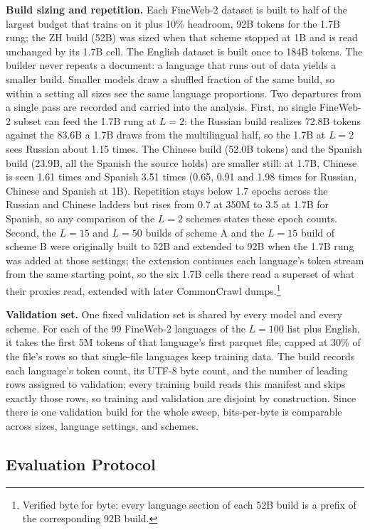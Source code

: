 \textbf{Build sizing and repetition.} Each FineWeb-2 dataset is built to half of the largest budget that trains on it plus 10\% headroom, 92B tokens for the 1.7B rung; the ZH build (52B) was sized when that scheme stopped at 1B and is read unchanged by its 1.7B cell. The English dataset is built once to 184B tokens. The builder never repeats a document: a language that runs out of data yields a smaller build. Smaller models draw a shuffled fraction of the same build, so within a setting all sizes see the same language proportions. Two departures from a single pass are recorded and carried into the analysis. First, no single FineWeb-2 subset can feed the 1.7B rung at $L=2$: the Russian build realizes 72.8B tokens against the 83.6B a 1.7B draws from the multilingual half, so the 1.7B at $L=2$ sees Russian about 1.15 times. The Chinese build (52.0B tokens) and the Spanish build (23.9B, all the Spanish the source holds) are smaller still: at 1.7B, Chinese is seen 1.61 times and Spanish 3.51 times (0.65, 0.91 and 1.98 times for Russian, Chinese and Spanish at 1B). Repetition stays below 1.7 epochs across the Russian and Chinese ladders but rises from 0.7 at 350M to 3.5 at 1.7B for Spanish, so any comparison of the $L=2$ schemes states these epoch counts. Second, the $L=15$ and $L=50$ builds of scheme A and the $L=15$ build of scheme B were originally built to 52B and extended to 92B when the 1.7B rung was added at those settings; the extension continues each language's token stream from the same starting point, so the six 1.7B cells there read a superset of what their proxies read, extended with later CommonCrawl dumps.\footnote{Verified byte for byte: every language section of each 52B build is a prefix of the corresponding 92B build.}

\textbf{Validation set.} One fixed validation set is shared by every model and every scheme. For each of the 99 FineWeb-2 languages of the $L=100$ list plus English, it takes the first 5M tokens of that language's first parquet file, capped at 30\% of the file's rows so that single-file languages keep training data. The build records each language's token count, its UTF-8 byte count, and the number of leading rows assigned to validation; every training build reads this manifest and skips exactly those rows, so training and validation are disjoint by construction. Since there is one validation build for the whole sweep, bits-per-byte is comparable across sizes, language settings, and schemes.

\subsection{Evaluation Protocol}
\label{app:evaluation-protocol}

